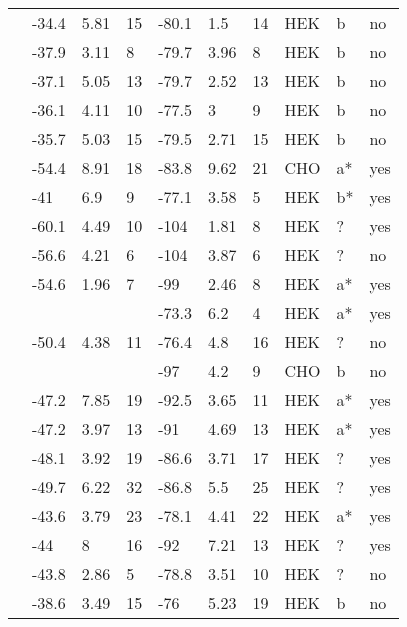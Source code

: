 \begin{longtable}{p{6cm}|lll|lll|lll}
\citet{Kapplinger2015MutationDB} & -34.4 & 5.81 & 15 & -80.1 & 1.5 & 14 & HEK & b & no \\
\citet{Kapplinger2015MutationDB} & -37.9 & 3.11 & 8 & -79.7 & 3.96 & 8 & HEK & b & no \\
\citet{Kapplinger2015MutationDB} & -37.1 & 5.05 & 13 & -79.7 & 2.52 & 13 & HEK & b & no \\
\citet{Kapplinger2015MutationDB} & -36.1 & 4.11 & 10 & -77.5 & 3 & 9 & HEK & b & no \\
\citet{Kapplinger2015MutationDB} & -35.7 & 5.03 & 15 & -79.5 & 2.71 & 15 & HEK & b & no \\
\citet{Kato2014MutationDB} & -54.4 & 8.91 & 18 & -83.8 & 9.62 & 21 & CHO & a* & yes \\
\citet{Keller2005MutationDB} & -41 & 6.9 & 9 & -77.1 & 3.58 & 5 & HEK & b* & yes \\
\citet{Keller2006MutationDB} & -60.1 & 4.49 & 10 & -104 & 1.81 & 8 & HEK & ? & yes \\
\citet{Li2009MutationDB} & -56.6 & 4.21 & 6 & -104 & 3.87 & 6 & HEK & ? & no \\
\citet{Lin2008MutationDB} & -54.6 & 1.96 & 7 & -99 & 2.46 & 8 & HEK & a* & yes \\
\citet{Liu2002MutationDB} & && & -73.3 & 6.2 & 4 & HEK & a* & yes \\
\citet{Liu2003aMutationDB} & -50.4 & 4.38 & 11 & -76.4 & 4.8 & 16 & HEK & ? & no \\
\citet{Liu2005MutationDB} & && & -97 & 4.2 & 9 & CHO & b & no \\
\citet{Lupoglazoff2001MutationDB} & -47.2 & 7.85 & 19 & -92.5 & 3.65 & 11 & HEK & a* & yes \\
\citet{Makita2002MutationDB} & -47.2 & 3.97 & 13 & -91 & 4.69 & 13 & HEK & a* & yes \\
\citet{Makita2005MutationDB} & -48.1 & 3.92 & 19 & -86.6 & 3.71 & 17 & HEK & ? & yes \\
\citet{Makita2008MutationDB} & -49.7 & 6.22 & 32 & -86.8 & 5.5 & 25 & HEK & ? & yes \\
\citet{Makiyama2008MutationDB} & -43.6 & 3.79 & 23 & -78.1 & 4.41 & 22 & HEK & a* & yes \\
\citet{Marangoni2011MutationDB} & -44 & 8 & 16 & -92 & 7.21 & 13 & HEK & ? & yes \\
\citet{MedeirosDomingo2007MutationDB} & -43.8 & 2.86 & 5 & -78.8 & 3.51 & 10 & HEK & ? & no \\
\citet{MedeirosDomingo2009MutationDB} & -38.6 & 3.49 & 15 & -76 & 5.23 & 19 & HEK & b & no \\

\end{longtable}
